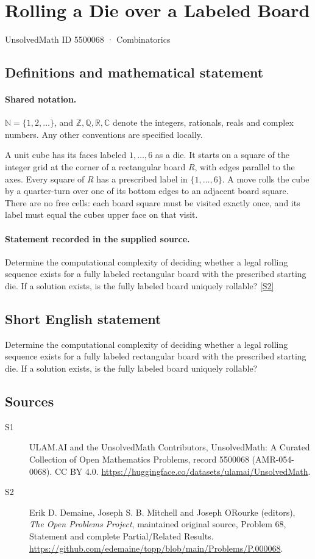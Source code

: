 \documentclass[11pt]{article}
\newcommand{\sref}[2]{\hyperlink{source:#1:#2}{[S#2]}}
\begin{document}
\setcounter{section}{5500067}
\section{Rolling a Die over a Labeled Board}\label{5500068}
{\small\sffamily UnsolvedMath ID 5500068 · Combinatorics}
\subsection{Definitions and mathematical statement}

\paragraph{Shared notation.}$\mathbb N=\{1,2,\ldots\}$, and $\mathbb Z,\mathbb Q,\mathbb R,\mathbb C$ denote the integers, rationals, reals and complex numbers. Any other conventions are specified locally.


A unit cube has its faces labeled $1,\ldots,6$ as a die. It starts on a square of the integer grid at the corner of a rectangular board $R$, with edges parallel to the axes. Every square of $R$ has a prescribed label in $\{1,\ldots,6\}$. A move rolls the cube by a quarter-turn over one of its bottom edges to an adjacent board square. There are no free cells: each board square must be visited exactly once, and its label must equal the cube\textquotesingle s upper face on that visit.
\paragraph{Statement recorded in the supplied source.}
Determine the computational complexity of deciding whether a legal rolling sequence exists for a fully labeled rectangular board with the prescribed starting die. If a solution exists, is the fully labeled board uniquely rollable? \sref{5500068}{2}
\subsection{Short English statement}
Determine the computational complexity of deciding whether a legal rolling sequence exists for a fully labeled rectangular board with the prescribed starting die. If a solution exists, is the fully labeled board uniquely rollable?
\subsection{Sources}
\begin{description}
\item[\hypertarget{source:5500068:1}{S1}] ULAM.AI and the UnsolvedMath Contributors, UnsolvedMath: A Curated Collection of Open Mathematics Problems, record 5500068 (AMR-054-0068). CC BY 4.0. \url{https://huggingface.co/datasets/ulamai/UnsolvedMath}.
\item[\hypertarget{source:5500068:2}{S2}] Erik D. Demaine, Joseph S. B. Mitchell and Joseph O\textquotesingle Rourke (editors), \emph{The Open Problems Project}, maintained original source, Problem 68, Statement and complete Partial/Related Results. \url{https://github.com/edemaine/topp/blob/main/Problems/P.000068}.
\end{description}
\label{end:5500068}
\end{document}
